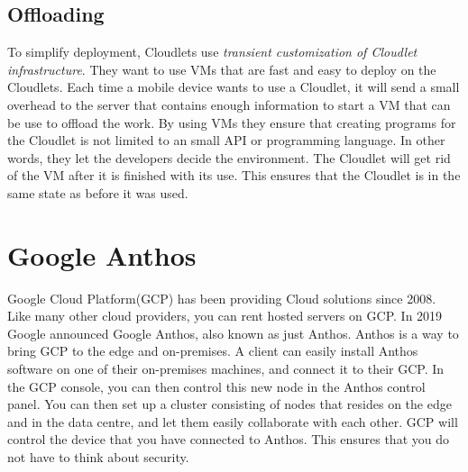 \subsection{Offloading}
To simplify deployment, Cloudlets use \textit{transient customization of Cloudlet infrastructure}. They want to use VMs that are fast and easy to deploy on the Cloudlets. Each time a mobile device wants to use a Cloudlet, it will send a small overhead to the server that contains enough information to start a VM that can be use to offload the work. By using VMs they ensure that creating programs for the Cloudlet is not limited to an small API or programming language. In other words, they let the developers decide the environment. The Cloudlet will get rid of the VM after it is finished with its use. This ensures that the Cloudlet is in the same state as before it was used.






\section{Google Anthos}
Google Cloud Platform(GCP) has been providing Cloud solutions since 2008. Like many other cloud providers, you can rent hosted servers on GCP. In 2019 Google announced Google Anthos, also known as just Anthos. Anthos is a way to bring GCP to the edge and on-premises\cite{noauthor_anthos_nodate}. A client can easily install Anthos software on one of their on-premises machines, and connect it to their GCP. In the GCP console, you can then control this new node in the Anthos control panel. You can then set up a cluster consisting of nodes that resides on the edge and in the data centre, and let them easily collaborate with each other. GCP will control the device that you have connected to Anthos. This ensures that you do not have to think about security.

